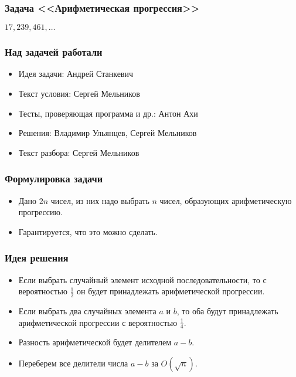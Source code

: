\begin{frame}
  \frametitle{Задача <<Арифметическая прогрессия>>}
  \begin{center}
    { \Huge $17, 239, 461, \ldots$ }
  \end{center}
\end{frame}

\begin{frame}
  \frametitle{Над задачей работали}
  \begin{itemize}
    \item Идея задачи: Андрей Станкевич
    \item Текст условия: Сергей Мельников
    \item Тесты, проверяющая программа и др.: Антон Ахи
    \item Решения: Владимир Ульянцев, Сергей Мельников
    \item Текст разбора: Сергей Мельников
  \end{itemize}
\end{frame}

\begin{frame}
  \frametitle{Формулировка задачи}
  \begin{itemize}
    \item Дано $2n$ чисел, из них надо выбрать $n$ чисел, образующих арифметическую прогрессию.
    \item Гарантируется, что это можно сделать.
  \end{itemize}
\end{frame}

\begin{frame}
  \frametitle{Идея решения}
  \begin{itemize}
    \item Если выбрать случайный элемент исходной последовательности,
    	 то с вероятностью $\frac{1}{2}$ он будет принадлежать арифметической прогрессии.
    \item Если выбрать два случайных элемента $a$ и $b$, то оба будут принадлежать арифметической прогрессии с вероятностью $\frac{1}{4}$.
    \item Разность арифметической будет делителем $a - b$.
    \item Переберем все делители числа $a - b$ за $O(\sqrt{n})$.
  \end{itemize}
\end{frame}

